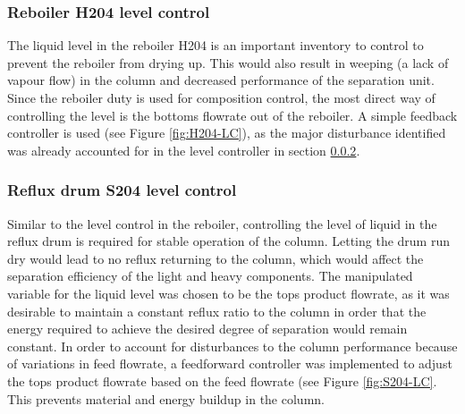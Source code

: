 \subsubsection{Reboiler H204 level control} %
The liquid level in the reboiler H204 is an important inventory to control to prevent the reboiler from drying up. This would also result in weeping (a lack of vapour flow) in the column and decreased performance of the separation unit. Since the reboiler duty is used for composition control, the most direct way of controlling the level is the bottoms flowrate out of the reboiler. A simple feedback controller is used (see Figure \ref{fig:H204-LC}), as the major disturbance identified was already accounted for in the level controller in section \ref{sec:S204-LC}. 

\subsubsection{Reflux drum S204 level control}%
\label{sec:S204-LC}
Similar to the level control in the reboiler, controlling the level of liquid in the reflux drum is required for stable operation of the column. Letting the drum run dry would lead to no reflux returning to the column, which would affect the separation efficiency of the light and heavy components. The manipulated variable for the liquid level was chosen to be the tops product flowrate, as it was desirable to maintain a constant reflux ratio to the column in order that the energy required to achieve the desired degree of separation would remain constant. In order to account for disturbances to the column performance because of variations in feed flowrate, a feedforward controller was implemented to adjust the tops product flowrate based on the feed flowrate (see Figure \ref{fig:S204-LC}. This prevents material and energy buildup in the column. 

